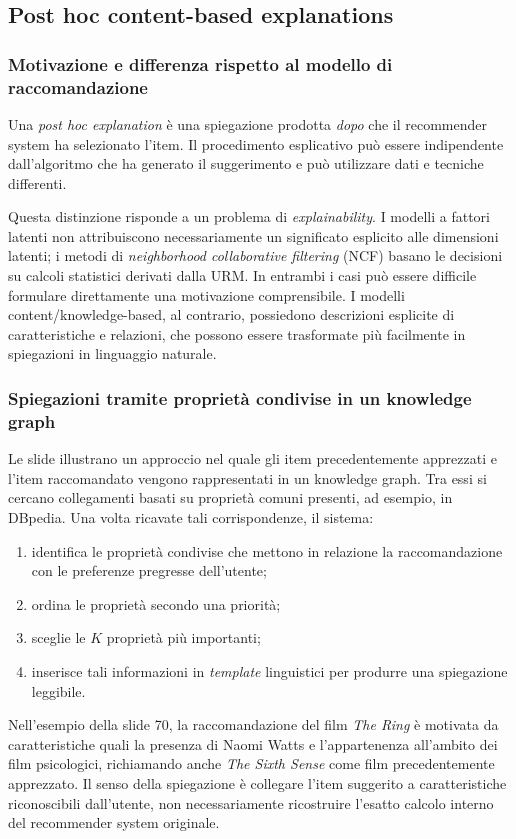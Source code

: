 \subsection{Post hoc content-based explanations}

\subsubsection{Motivazione e differenza rispetto al modello di raccomandazione}
Una \emph{post hoc explanation} è una spiegazione prodotta \emph{dopo} che il recommender system ha selezionato l'item. Il procedimento esplicativo può essere indipendente dall'algoritmo che ha generato il suggerimento e può utilizzare dati e tecniche differenti.

Questa distinzione risponde a un problema di \emph{explainability}. I modelli a fattori latenti non attribuiscono necessariamente un significato esplicito alle dimensioni latenti; i metodi di \emph{neighborhood collaborative filtering} (NCF) basano le decisioni su calcoli statistici derivati dalla URM. In entrambi i casi può essere difficile formulare direttamente una motivazione comprensibile. I modelli content/knowledge-based, al contrario, possiedono descrizioni esplicite di caratteristiche e relazioni, che possono essere trasformate più facilmente in spiegazioni in linguaggio naturale.

\subsubsection{Spiegazioni tramite proprietà condivise in un knowledge graph}
Le slide illustrano un approccio nel quale gli item precedentemente apprezzati e l'item raccomandato vengono rappresentati in un knowledge graph. Tra essi si cercano collegamenti basati su proprietà comuni presenti, ad esempio, in DBpedia. Una volta ricavate tali corrispondenze, il sistema:
\begin{enumerate}
    \item identifica le proprietà condivise che mettono in relazione la raccomandazione con le preferenze pregresse dell'utente;
    \item ordina le proprietà secondo una priorità;
    \item sceglie le $K$ proprietà più importanti;
    \item inserisce tali informazioni in \emph{template} linguistici per produrre una spiegazione leggibile.
\end{enumerate}
Nell'esempio della slide 70, la raccomandazione del film \emph{The Ring} è motivata da caratteristiche quali la presenza di Naomi Watts e l'appartenenza all'ambito dei film psicologici, richiamando anche \emph{The Sixth Sense} come film precedentemente apprezzato. Il senso della spiegazione è collegare l'item suggerito a caratteristiche riconoscibili dall'utente, non necessariamente ricostruire l'esatto calcolo interno del recommender system originale.


